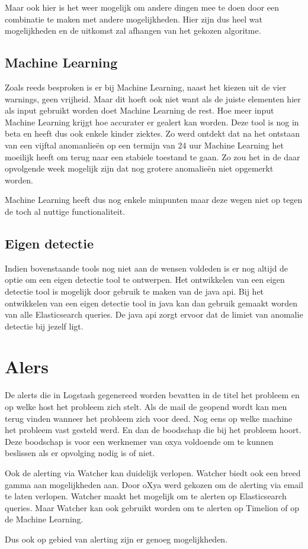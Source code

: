 Maar ook hier is het weer mogelijk om andere dingen mee te doen door een combinatie te maken met andere mogelijkheden.
Hier zijn dus heel wat mogelijkheden en de uitkomst zal afhangen van het gekozen algoritme. 

\subsection{Machine Learning}
\label{subsec:machine-learning}

Zoals reeds besproken is er bij Machine Learning, naast het kiezen uit de vier warnings, geen vrijheid. Maar dit hoeft ook niet want als de juiste elementen hier als input gebruikt worden doet Machine Learning de rest. Hoe meer input Machine Learning krijgt hoe accurater er gealert kan worden. 
Deze tool is nog in beta en heeft dus ook enkele kinder ziektes. Zo werd ontdekt dat na het ontstaan van een vijftal anomanlieën op een termijn van 24 uur Machine Learning het moeilijk heeft om terug naar een stabiele toestand te gaan. Zo zou het in de daar opvolgende week mogelijk zijn dat nog grotere anomalieën niet opgemerkt worden.

Machine Learning heeft dus nog enkele minpunten maar deze wegen niet op tegen de toch al nuttige functionaliteit.

\subsection{Eigen detectie}
\label{subsec:eingen-detectie}

Indien bovenstaande tools nog niet aan de wensen voldeden is er nog altijd de optie om een eigen detectie tool te ontwerpen. Het ontwikkelen van een eigen detectie tool is mogelijk door gebruik te maken van de java api. 
Bij het ontwikkelen van een eigen detectie tool in java kan dan gebruik gemaakt worden van alle Elasticsearch queries. 
De java api zorgt ervoor dat de limiet van anomalie detectie bij jezelf ligt.

\section{Alers}
\label{sec:alerts}

De alerts die in Logstash gegenereed worden bevatten in de titel het probleem en op welke host het probleem zich stelt.
Als de mail de geopend wordt kan men terug vinden wanneer het probleem zich voor deed. Nog eens op welke machine het probleem vast gesteld werd. En dan de boodschap die bij het probleem hoort. 
Deze boodschap is voor een werknemer van oxya voldoende om te kunnen beslissen als er opvolging nodig is of niet.

Ook de alerting via Watcher kan duidelijk verlopen. Watcher biedt ook een breed gamma aan mogelijkheden aan. Door oXya werd gekozen om de alerting via email te laten verlopen.
Watcher maakt het mogelijk om te alerten op Elasticsearch queries. Maar Watcher kan ook gebruikt worden om te alerten op Timelion of op de Machine Learning.

Dus ook op gebied van alerting zijn er genoeg mogelijkheden.